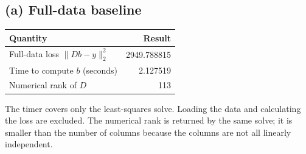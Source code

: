 \documentclass[11pt,a4paper]{article}
\begin{document}
\subsection*{(a) Full-data baseline}
\begin{center}
\begin{tabular}{lr}
\toprule
Quantity & Result \\
\midrule
Full-data loss $\|Db-y\|_2^2$ & 2949.788815 \\
Time to compute $b$ (seconds) & 2.127519 \\
Numerical rank of $D$ & 113 \\
\bottomrule
\end{tabular}
\end{center}
The timer covers only the least-squares solve. Loading the data and calculating
the loss are excluded. The numerical rank is returned by the same solve;
it is smaller than the number of columns because the columns are not all
linearly independent.

\clearpage
\end{document}

